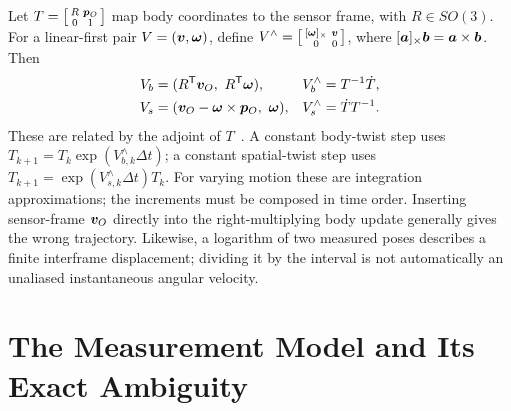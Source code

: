Let $T=\left[\begin{smallmatrix}R&\bm{p}_O\\0&1\end{smallmatrix}\right]$ map body coordinates to the sensor frame, with $R\in SO(3)$.
For a linear-first pair $V=(\bm{v},\bm{\omega})$, define $V^\wedge=\left[\begin{smallmatrix}[\bm{\omega}]_\times&\bm{v}\\0&0\end{smallmatrix}\right]$, where $[\bm{a}]_\times\bm{b}=\bm{a}\times\bm{b}$.
Then
\begin{equation}
\label{eq:screw-frames}
\begin{aligned}
V_b&=(R^{\mathsf T}\bm{v}_O,\ R^{\mathsf T}\bm{\omega}),
&V_b^\wedge&=T^{-1}\dot T,\\
V_s&=(\bm{v}_O-\bm{\omega}\times\bm{p}_O,\ \bm{\omega}),
&V_s^\wedge&=\dot T T^{-1}.
\end{aligned}
\end{equation}
These are related by the adjoint of $T$~\cite{modernroboticstwists}.
A constant body-twist step uses $T_{k+1}=T_k\exp(V_{b,k}^\wedge\Delta t)$; a constant spatial-twist step uses $T_{k+1}=\exp(V_{s,k}^\wedge\Delta t)T_k$.
For varying motion these are integration approximations; the increments must be composed in time order.
Inserting sensor-frame $\bm{v}_O$ directly into the right-multiplying body update generally gives the wrong trajectory.
Likewise, a logarithm of two measured poses describes a finite interframe displacement; dividing it by the interval is not automatically an unaliased instantaneous angular velocity.

\section{The Measurement Model and Its Exact Ambiguity}
\label{sec:screw-measurement}

